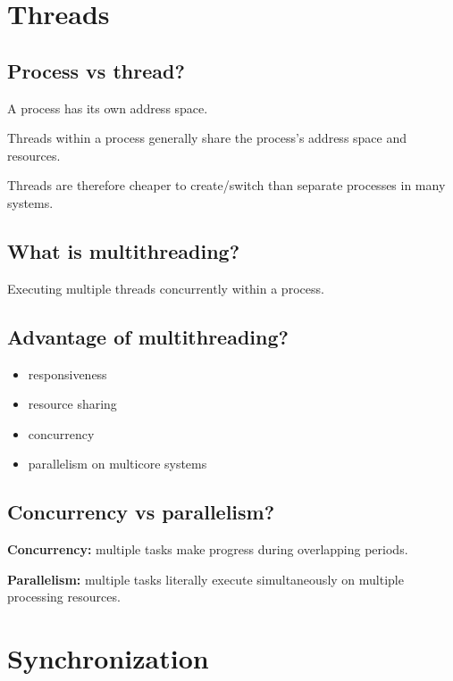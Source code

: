 \medskip

\section{Threads}

\subsection{Process vs thread?}

A process has its own address space.

Threads within a process generally share the process's address space and resources.

Threads are therefore cheaper to create/switch than separate processes in many systems.

\medskip

\subsection{What is multithreading?}

Executing multiple threads concurrently within a process.

\medskip

\subsection{Advantage of multithreading?}

\begin{itemize}
  \item responsiveness
  \item resource sharing
  \item concurrency
  \item parallelism on multicore systems
\end{itemize}

\medskip

\subsection{Concurrency vs parallelism?}

\textbf{Concurrency:} multiple tasks make progress during overlapping periods.

\textbf{Parallelism:} multiple tasks literally execute simultaneously on multiple processing resources.

\medskip

\section{Synchronization}

